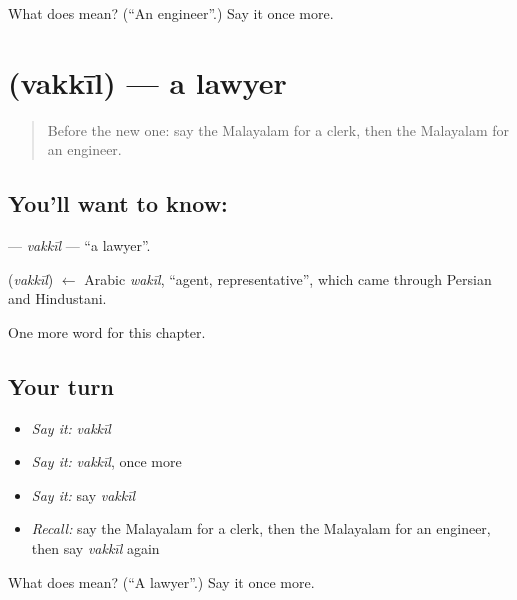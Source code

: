 \begin{tcolorbox}[breakable,colback=teal!4,colframe=teal!35!black,title={Before you move on}]
What does  mean? (\textquotedblleft{}An engineer\textquotedblright{}.) Say it once more.
\end{tcolorbox}
\section[\texorpdfstring{\ml{വക്കീൽ} (vakkīl)}{വക്കീൽ (vakkīl)}]{ (vakkīl) — a lawyer}

\label{lesson:ML-C220-vakkil}



\begin{quote}
Before the new one: say the Malayalam for a clerk, then the Malayalam for an engineer.
\end{quote}

\subsection*{You'll want to know: }
\textbf{} — \emph{vakkīl} — \textquotedblleft{}a lawyer\textquotedblright{}.

\begin{cousinweb}
\textbf{} (\emph{vakkīl}) $\leftarrow$ Arabic \emph{wakīl}, \textquotedblleft{}agent, representative\textquotedblright{}, which came through Persian and Hindustani.
\end{cousinweb}

\begin{grammarlens}[title={What you've built}]
One more word for this chapter.
\end{grammarlens}

\subsection*{Your turn}
\begin{itemize}
\raggedright
  \item \emph{Say it:} \emph{vakkīl}
  \item \emph{Say it:} \emph{vakkīl}, once more
  \item \emph{Say it:} say \emph{vakkīl}
  \item \emph{Recall:} say the Malayalam for a clerk, then the Malayalam for an engineer, then say \emph{vakkīl} again
\end{itemize}

\begin{tcolorbox}[breakable,colback=teal!4,colframe=teal!35!black,title={Before you move on}]
What does  mean? (\textquotedblleft{}A lawyer\textquotedblright{}.) Say it once more.
\end{tcolorbox}
